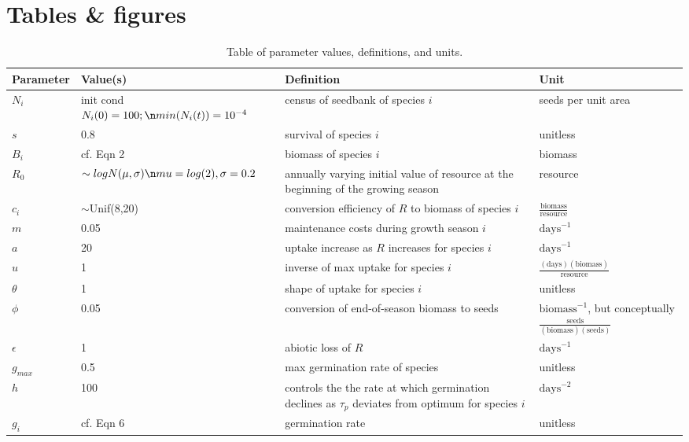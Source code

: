 \documentclass[11pt,letter]{article}
\begin{document}
\clearpage
\section{Tables \& figures}


\begin{center}
\begin{table}[h!]
\caption{Table of parameter values, definitions, and units.}
\begin{tabular}{ | p{2.0cm} | p{3.5cm} | p{5.0cm} | p{4.0cm} |}
\hline 
Parameter & Value(s) & Definition & Unit \\ \hline 
\(N_{i}\) & init cond $N_{i}(0) = 100; \n min(N_{i}(t)) = 10^{-4}$ & census of seedbank of species \(i\) & seeds per unit area \\ \hline
\(s\) & 0.8 & survival of species \(i\) & unitless \\ \hline
\(B_{i}\) & cf. Eqn 2 & biomass of species \(i\) & biomass \\ \hline
\(R_0\) & $\sim logN(\mu, \sigma)\n mu=log(2),\sigma = 0.2 $ & annually varying initial value of resource at the beginning of the growing season & resource\\ \hline
\(c_{i}\) & $\sim$Unif(8,20) & conversion efficiency of \(R\) to biomass of species \(i\) &  \(\frac{\text{biomass}}{\text{resource}}\) \\ \hline
\(m\) & 0.05 & maintenance costs during growth season \(i\) & \(\text{days}^{-1}\) \\ \hline
\(a\) & 20 & uptake increase as \(R\) increases for species \(i\) & \(\text{days}^{-1}\) \\ \hline
\(u\) & 1 & inverse of max uptake for species \(i\) & \(\frac{(\text{days})(\text{biomass})}{\text{resource}}\) \\ \hline
\(\theta\) & 1 & shape of uptake for species \(i\) & unitless\\ \hline
\(\phi\) & 0.05 & conversion of end-of-season biomass to seeds & \(\text{biomass}^{-1}\), but conceptually \(\frac{\text{seeds}}{(\text{biomass})(\text{seeds})}\) \\ \hline
\(\epsilon\) & 1 & abiotic loss of \(R\) &  \(\text{days}^{-1}\) \\ \hline
\(g_{max}\) & 0.5 & max germination rate of species & unitless \\ \hline
\(h\) & 100 &  controls the the rate at which germination declines as \(\tau_{p}\) deviates from optimum for species \(i\)  & \(\text{days}^{-2}\) \\ \hline
\(g_{i}\) & cf. Eqn 6 & germination rate & unitless \\ \hline

\end{tabular}
\end{table}
\end{center}
\end{document}
